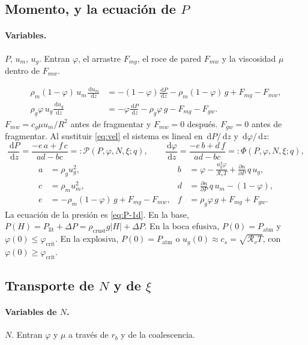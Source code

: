\documentclass[11pt,a4paper]{article}
\newcommand{\dd}{\,\mathrm{d}}
\newcommand{\p}{\partial}
\newcommand{\Rv}{\mathcal{R}_v}
\begin{document}
\subsection{\texorpdfstring{Momento, y la ecuación de $P$}{Momento, y la ecuación de P}}

\paragraph{Variables.}
$P$, $u_m$, $u_g$. Entran $\varphi$, el arrastre $F_{mg}$, el roce de
pared $F_{mw}$ y la viscosidad $\mu$ dentro de $F_{mw}$.

\begin{align}
\label{eq:mom-1d}
\rho_m(1-\varphi)\,u_m\frac{\dd u_m}{\dd z}
&=-(1-\varphi)\frac{\dd P}{\dd z}
-\rho_m(1-\varphi)\,g
+F_{mg}-F_{mw},
\\
\rho_g\varphi\,u_g\frac{\dd u_g}{\dd z}
&=-\varphi\frac{\dd P}{\dd z}
-\rho_g\varphi\,g
-F_{mg}-F_{gw}.
\end{align}
$F_{mw}=c_g\mu u_m/R^2$ antes de fragmentar y $F_{mw}=0$ después.
$F_{gw}=0$ antes de fragmentar. Al sustituir \eqref{eq:vel} el
sistema es lineal en $\dd P/\dd z$ y $\dd\varphi/\dd z$:
\begin{equation}
\label{eq:P-1d}
\frac{\dd P}{\dd z}
=\frac{-e\,a+f\,c}{ad-bc}
=:\mathcal{P}(P,\varphi,N,\xi;q),
\qquad
\frac{\dd\varphi}{\dd z}
=\frac{-e\,b+d\,f}{ad-bc}
=:\Phi(P,\varphi,N,\xi;q),
\end{equation}
\begin{align*}
a&=\rho_g u_g^2, &
b&=\varphi-\frac{u_g^2\varphi}{\Rv T}+\frac{\p n}{\p P}\,q\,u_g,\\
c&=\rho_m u_m^2, &
d&=\frac{\p n}{\p P}\,q\,u_m-(1-\varphi),\\
e&=-\rho_m(1-\varphi)\,g+F_{mg}-F_{mw}, &
f&=\rho_g\varphi\,g+F_{mg}+F_{gw}.
\end{align*}
La ecuación de la presión es \eqref{eq:P-1d}. En la base,
$P(H)=P_{\mathrm{lit}}+\Delta P=\rho_{\mathrm{crust}}g|H|+\Delta P$.
En la boca efusiva, $P(0)=P_{\mathrm{atm}}$ y
$\varphi(0)\le\varphi_{\mathrm{crit}}$. En la explosiva,
$P(0)=P_{\mathrm{atm}}$ o $u_g(0)\approx c_s=\sqrt{\Rv T}$, con
$\varphi(0)\ge\varphi_{\mathrm{crit}}$.

\subsection{\texorpdfstring{Transporte de $N$ y de $\xi$}{Transporte de N y de xi}}

\paragraph{Variables de $N$.}
$N$. Entran $\varphi$ y $\mu$ a través de $r_b$ y de la coalescencia.
\end{document}
